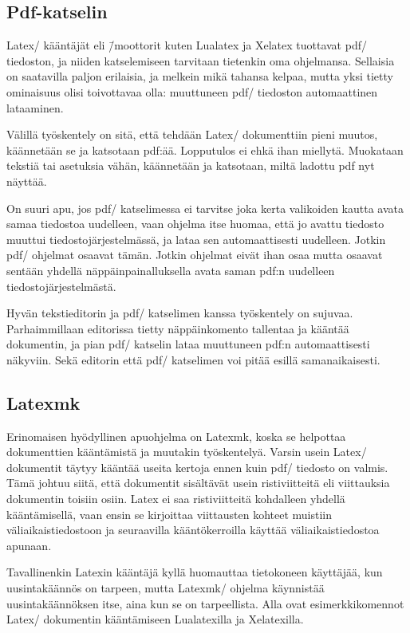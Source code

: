 \subsection{Pdf-katselin}

Latex\-/ kääntäjät eli \=/moottorit kuten Lualatex ja Xelatex tuottavat
pdf\-/ tiedoston, ja niiden katselemiseen tarvitaan tietenkin oma
ohjelmansa. Sellaisia on saatavilla paljon erilaisia, ja melkein mikä
tahansa kelpaa, mutta yksi tietty ominaisuus olisi toivottavaa olla:
muuttuneen pdf\-/ tiedoston automaattinen lataaminen.

Välillä työskentely on sitä, että tehdään Latex\-/ dokumenttiin pieni
muutos, käännetään se ja katsotaan pdf:ää. Lopputulos ei ehkä ihan
miellytä. Muokataan tekstiä tai asetuksia vähän, käännetään ja
katsotaan, miltä ladottu pdf nyt näyttää.

On suuri apu, jos pdf\-/ katselimessa ei tarvitse joka kerta valikoiden
kautta avata samaa tiedostoa uudelleen, vaan ohjelma itse huomaa, että
jo avattu tiedosto muuttui tiedostojärjestelmässä, ja lataa sen
automaattisesti uudelleen. Jotkin pdf\-/ ohjelmat osaavat tämän. Jotkin
ohjelmat eivät ihan osaa mutta osaavat sentään yhdellä
näppäinpainalluksella avata saman pdf:n uudelleen
tiedostojärjestelmästä.

Hyvän tekstieditorin ja pdf\-/ katselimen kanssa työskentely on sujuvaa.
Parhaimmillaan editorissa tietty näppäinkomento tallentaa ja kääntää
dokumentin, ja pian pdf\-/ katselin lataa muuttuneen pdf:n
automaattisesti näkyviin. Sekä editorin että pdf\-/ katselimen voi pitää
esillä samanaikaisesti.

\subsection{Latexmk}
\label{luku/latexmk}

Erinomaisen hyödyllinen apuohjelma on Latexmk, koska se helpottaa
dokumenttien kääntämistä ja muutakin työskentelyä. Varsin usein Latex\-/
dokumentit täytyy kääntää useita kertoja ennen kuin pdf\-/ tiedosto on
valmis. Tämä johtuu siitä, että dokumentit sisältävät usein
ristiviitteitä eli viittauksia dokumentin toisiin osiin. Latex ei saa
ristiviitteitä kohdalleen yhdellä kääntämisellä, vaan ensin se
kirjoittaa viittausten kohteet muistiin väliaikaistiedostoon ja
seuraavilla kääntökerroilla käyttää väliaikaistiedostoa apunaan.

Tavallinenkin Latexin kääntäjä kyllä huomauttaa tietokoneen käyttäjää,
kun uusintakäännös on tarpeen, mutta Latexmk\-/ ohjelma käynnistää
uusintakäännöksen itse, aina kun se on tarpeellista. Alla ovat
esimerkkikomennot Latex\-/ dokumentin kääntämiseen Lualatexilla ja
Xelatexilla.

